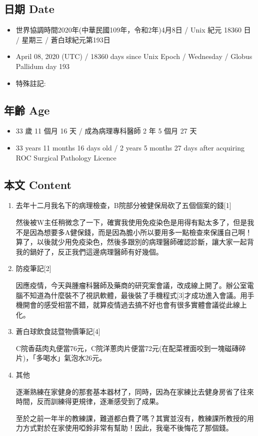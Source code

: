 \documentclass[
]{article}
\providecommand{\tightlist}{%
  \setlength{\itemsep}{0pt}\setlength{\parskip}{0pt}}
\begin{document}
\hypertarget{ux65e5ux671f-date-7}{%
\subsection{日期 Date}\label{ux65e5ux671f-date-7}}

\begin{itemize}
\tightlist
\item
  世界協調時間2020年(中華民國109年，令和2年)4月8日 / Unix 紀元 18360 日
  / 星期三 / 蒼白球紀元第193日
\item
  April 08, 2020 (UTC) / 18360 days since Unix Epoch / Wednesday /
  Globus Pallidum day 193
\item
  特殊註記:
\end{itemize}

\hypertarget{ux5e74ux9f61-age-7}{%
\subsection{年齡 Age}\label{ux5e74ux9f61-age-7}}

\begin{itemize}
\tightlist
\item
  33 歲 11 個月 16 天 / 成為病理專科醫師 2 年 5 個月 27 天
\item
  33 years 11 months 16 days old / 2 years 5 months 27 days after
  acquiring ROC Surgical Pathology Licence
\end{itemize}

\hypertarget{ux672cux6587-content-7}{%
\subsection{本文 Content}\label{ux672cux6587-content-7}}

\begin{enumerate}
\def\labelenumi{\arabic{enumi}.}
\item
  去年十二月我名下的病理檢查，B院部分被健保局砍了五個個案的錢{[}1{]}

  然後被W主任稍微念了一下，確實我使用免疫染色是用得有點太多了，但是我不是因為想要多A健保錢，而是因為膽小所以要用多一點檢查來保護自己啊！算了，以後就少用免疫染色，然後多跟別的病理醫師確認診斷，讓大家一起背我的鍋好了，反正我們這邊病理醫師有好幾個。
\item
  防疫筆記{[}2{]}

  因應疫情，今天與腫瘤科醫師及藥商的研究案會議，改成線上開了。辦公室電腦不知道為什麼裝不了視訊軟體，最後裝了手機程式{[}3{]}才成功進入會議。用手機開會的感受相當不錯，就算疫情過去搞不好也會有很多實體會議從此線上化。
\item
  蒼白球飲食誌暨物價筆記{[}4{]}

  C院香菇肉丸便當76元，C院洋蔥肉片便當72元(在配菜裡面咬到一塊磁磚碎片)，「多喝水」氣泡水26元。
\item
  其他

  逐漸熟練在家健身的那套基本器材了，同時，因為在家練比去健身房省了往來時間，反而訓練得更規律，逐漸感受到了成果。

  至於之前一年半的教練課，難道都白費了嗎？其實並沒有，教練課所教授的用力方式對於在家使用啞鈴非常有幫助！因此，我毫不後悔花了那個錢。
\end{enumerate}
\end{document}
